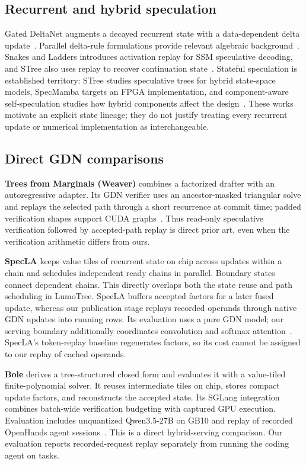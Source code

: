 \documentclass[conference]{IEEEtran}
\newcommand{\sys}{LumoTree}
\begin{document}
\subsection{Recurrent and hybrid speculation}
Gated DeltaNet augments a decayed recurrent state with a data-dependent delta update~\cite{yang2024gated}. Parallel delta-rule formulations provide relevant algebraic background~\cite{yang2024delta}. Snakes and Ladders introduces activation replay for SSM speculative decoding, and STree also uses replay to recover continuation state~\cite{wu2024snakes,wu2025stree}. Stateful speculation is established territory: STree studies speculative trees for hybrid state-space models, SpecMamba targets an FPGA implementation, and component-aware self-speculation studies how hybrid components affect the design~\cite{wu2025stree,zhong2025specmamba,borobia2026component}. These works motivate an explicit state lineage; they do not justify treating every recurrent update or numerical implementation as interchangeable.

\subsection{Direct GDN comparisons}
\textbf{Trees from Marginals (Weaver)} combines a factorized drafter with an autoregressive adapter. Its GDN verifier uses an ancestor-masked triangular solve and replays the selected path through a short recurrence at commit time; padded verification shapes support CUDA graphs~\cite{oda2026marginals}. Thus read-only speculative verification followed by accepted-path replay is direct prior art, even when the verification arithmetic differs from ours.

\textbf{SpecLA} keeps value tiles of recurrent state on chip across updates within a chain and schedules independent ready chains in parallel. Boundary states connect dependent chains. This directly overlaps both the state reuse and path scheduling in \sys{}. SpecLA buffers accepted factors for a later fused update, whereas our publication stage replays recorded operands through native GDN updates into running rows. Its evaluation uses a pure GDN model; our serving boundary additionally coordinates convolution and softmax attention~\cite{wang2026specla}. SpecLA's token-replay baseline regenerates factors, so its cost cannot be assigned to our replay of cached operands.

\textbf{Bole} derives a tree-structured closed form and evaluates it with a value-tiled finite-polynomial solver. It reuses intermediate tiles on chip, stores compact update factors, and reconstructs the accepted state. Its SGLang integration combines batch-wide verification budgeting with captured GPU execution. Evaluation includes unquantized Qwen3.5-27B on GB10 and replay of recorded OpenHands agent sessions~\cite{wang2026bole}. This is a direct hybrid-serving comparison. Our evaluation reports recorded-request replay separately from running the coding agent on tasks.
\end{document}
